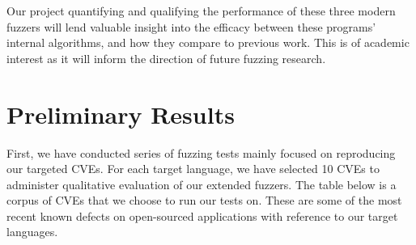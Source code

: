 \documentclass[12pt]{diazessay}
\begin{document}
Our project quantifying and qualifying the performance of these three modern fuzzers will lend valuable insight into the efficacy between these programs' internal algorithms, and how they compare to previous work.
This is of academic interest as it will inform the direction of future fuzzing research.


\section*{Preliminary Results}
\label{results}
\vspace{-0.25cm}

First, we have conducted series of fuzzing tests mainly focused on reproducing our targeted CVEs.
For each target language, we have selected 10 CVEs to administer qualitative evaluation of our extended fuzzers.
The table below is a corpus of CVEs that we choose to run our tests on.
These are some of the most recent known defects on open-sourced applications with reference to our target languages.
\end{document}

